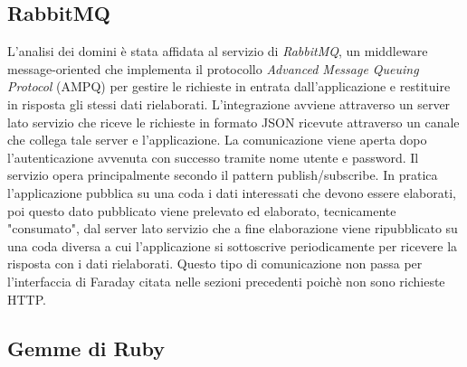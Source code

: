 \documentclass[target=bach,aauheader=,style=]{thud}
\begin{document}
\subsection{RabbitMQ}

L'analisi dei domini è stata affidata al servizio di \textit{RabbitMQ}\cite{rabbitmq}, un middleware message-oriented che implementa il protocollo \textit{Advanced Message Queuing Protocol}
(AMPQ) per gestire le richieste in entrata dall'applicazione e restituire in risposta gli stessi dati rielaborati.
L'integrazione avviene attraverso un server lato servizio che riceve le richieste in formato JSON ricevute attraverso un canale che collega tale server e l'applicazione.
La comunicazione viene aperta dopo l'autenticazione avvenuta con successo tramite nome utente e password.
Il servizio opera principalmente secondo il pattern publish/subscribe. In pratica l'applicazione pubblica su una coda i dati interessati che devono essere elaborati,
poi questo dato pubblicato viene prelevato ed elaborato, tecnicamente "consumato", dal server lato servizio che a fine elaborazione viene ripubblicato su una coda diversa
a cui l'applicazione si sottoscrive periodicamente per ricevere la risposta con i dati rielaborati.
Questo tipo di comunicazione non passa per l'interfaccia di Faraday citata nelle sezioni precedenti poichè non sono richieste HTTP.

\subsection{Gemme di Ruby}
\end{document}
